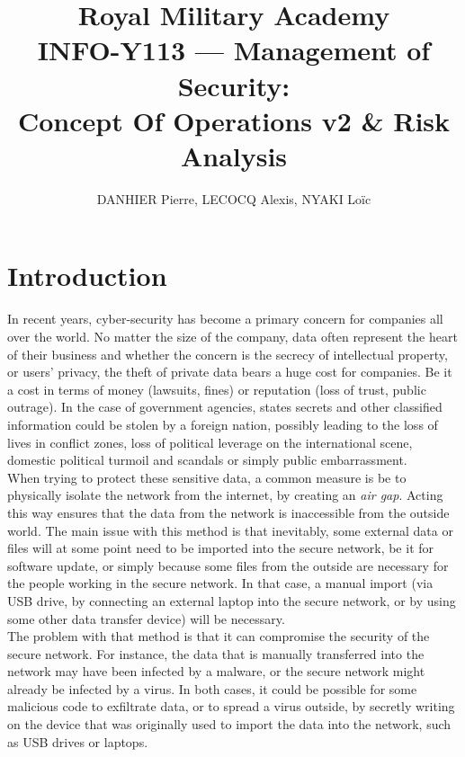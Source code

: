 \documentclass[a4paper,11pt]{article}
\title{Royal Military Academy\\
	INFO-Y113 --- Management of Security: \\
	Concept Of Operations v2 \& Risk Analysis}
\author{DANHIER Pierre, LECOCQ Alexis, NYAKI Loïc}
\begin{document}
\maketitle
\newpage
\tableofcontents

\newpage

\section{Introduction}
In recent years, cyber-security has become a primary concern for companies all over the world. No matter the size of the company, data often represent the heart of their business and whether the concern is the secrecy of intellectual property, or users' privacy, the theft of private data bears a huge cost for companies. Be it a cost in terms of money (lawsuits, fines) or reputation (loss of trust, public outrage). In the case of government agencies, states secrets and other classified information could be stolen by a foreign nation, possibly leading to the loss of lives in conflict zones, loss of political leverage on the international scene, domestic political turmoil and scandals or simply public embarrassment.\\

When trying to protect these sensitive data, a common measure is be to physically isolate the network from the internet, by creating an \textit{air gap}. Acting this way ensures that the data from the network is inaccessible from the outside world. The main issue with this method is that inevitably, some external data or files will at some point need to be imported into the secure network, be it for software update, or simply because some files from the outside are necessary for the people working in the secure network. In that case, a manual import (via USB drive, by connecting an external laptop into the secure network, or by using some other data transfer device) will be necessary.\\

The problem with that method is that it can compromise the security of the secure network. For instance, the data that is manually transferred into the network may have been infected by a malware, or the secure network might already be infected by a virus. In both cases, it could be possible for some malicious code to exfiltrate data, or to spread a virus outside, by secretly writing on the device that was originally used to import the data into the network, such as USB drives or laptops.\\
\end{document}
